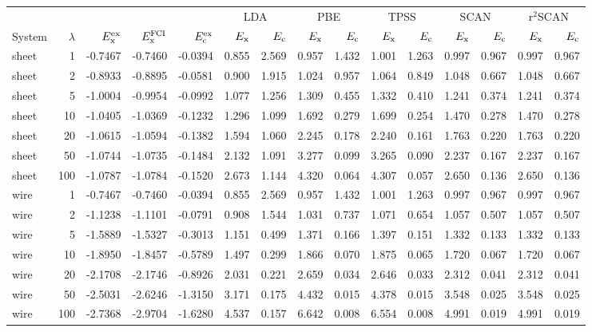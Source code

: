 \begin{tabular}{lrrrrrrrrrrrrrr}
\toprule
& & & & & \multicolumn{2}{c}{LDA} & \multicolumn{2}{c}{PBE} & \multicolumn{2}{c}{TPSS} & \multicolumn{2}{c}{SCAN} & \multicolumn{2}{c}{r$^2$SCAN} \\
System & $\lambda$ & $E_{\rm x}^{\rm ex}$ & $E_{\rm x}^{\rm FCI}$ & $E_{\rm c}^{\rm ex}$ & $E_{\rm x}$ & $E_{\rm c}$ & $E_{\rm x}$ & $E_{\rm c}$ & $E_{\rm x}$ & $E_{\rm c}$ & $E_{\rm x}$ & $E_{\rm c}$ & $E_{\rm x}$ & $E_{\rm c}$ \\
\midrule
sheet & 1 & -0.7467 & -0.7460 & -0.0394 & 0.855 & 2.569 & 0.957 & 1.432 & 1.001 & 1.263 & 0.997 & 0.967 & 0.997 & 0.967 \\
sheet & 2 & -0.8933 & -0.8895 & -0.0581 & 0.900 & 1.915 & 1.024 & 0.957 & 1.064 & 0.849 & 1.048 & 0.667 & 1.048 & 0.667 \\
sheet & 5 & -1.0004 & -0.9954 & -0.0992 & 1.077 & 1.256 & 1.309 & 0.455 & 1.332 & 0.410 & 1.241 & 0.374 & 1.241 & 0.374 \\
sheet & 10 & -1.0405 & -1.0369 & -0.1232 & 1.296 & 1.099 & 1.692 & 0.279 & 1.699 & 0.254 & 1.470 & 0.278 & 1.470 & 0.278 \\
sheet & 20 & -1.0615 & -1.0594 & -0.1382 & 1.594 & 1.060 & 2.245 & 0.178 & 2.240 & 0.161 & 1.763 & 0.220 & 1.763 & 0.220 \\
sheet & 50 & -1.0744 & -1.0735 & -0.1484 & 2.132 & 1.091 & 3.277 & 0.099 & 3.265 & 0.090 & 2.237 & 0.167 & 2.237 & 0.167 \\
sheet & 100 & -1.0787 & -1.0784 & -0.1520 & 2.673 & 1.144 & 4.320 & 0.064 & 4.307 & 0.057 & 2.650 & 0.136 & 2.650 & 0.136 \\
\midrule
wire & 1 & -0.7467 & -0.7460 & -0.0394 & 0.855 & 2.569 & 0.957 & 1.432 & 1.001 & 1.263 & 0.997 & 0.967 & 0.997 & 0.967 \\
wire & 2 & -1.1238 & -1.1101 & -0.0791 & 0.908 & 1.544 & 1.031 & 0.737 & 1.071 & 0.654 & 1.057 & 0.507 & 1.057 & 0.507 \\
wire & 5 & -1.5889 & -1.5327 & -0.3013 & 1.151 & 0.499 & 1.371 & 0.166 & 1.397 & 0.151 & 1.332 & 0.133 & 1.332 & 0.133 \\
wire & 10 & -1.8950 & -1.8457 & -0.5789 & 1.497 & 0.299 & 1.866 & 0.070 & 1.875 & 0.065 & 1.720 & 0.067 & 1.720 & 0.067 \\
wire & 20 & -2.1708 & -2.1746 & -0.8926 & 2.031 & 0.221 & 2.659 & 0.034 & 2.646 & 0.033 & 2.312 & 0.041 & 2.312 & 0.041 \\
wire & 50 & -2.5031 & -2.6246 & -1.3150 & 3.171 & 0.175 & 4.432 & 0.015 & 4.378 & 0.015 & 3.548 & 0.025 & 3.548 & 0.025 \\
wire & 100 & -2.7368 & -2.9704 & -1.6280 & 4.537 & 0.157 & 6.642 & 0.008 & 6.554 & 0.008 & 4.991 & 0.019 & 4.991 & 0.019 \\
\bottomrule
\end{tabular}
